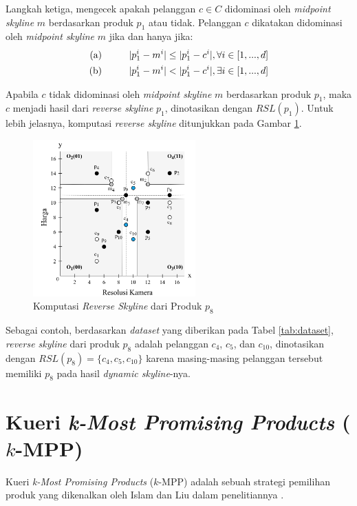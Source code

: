 Langkah ketiga, mengecek apakah pelanggan $c \in C$ didominasi oleh \textit{midpoint skyline} $m$ berdasarkan produk $p_1$ atau tidak. Pelanggan $c$ dikatakan didominasi oleh \textit{midpoint skyline} $m$ jika dan hanya jika:
\begin{equation}\label{eq:mid-skyline}
\begin{split}
\text{(a)} \hspace*{1cm} |p_1^i - m^i| \leq |p_1^i - c^i|, \forall i \in [1, ..., d] \\
\text{(b)} \hspace*{1cm} |p_1^i - m^i| < |p_1^i - c^i|, \exists i \in [1, ..., d]
\end{split}
\end{equation}

Apabila $c$ tidak didominasi oleh \textit{midpoint skyline} $m$ berdasarkan produk $p_1$, maka $c$ menjadi hasil dari \textit{reverse skyline} $p_1$, dinotasikan dengan $RSL(p_1)$. Untuk lebih jelasnya, komputasi \textit{reverse skyline} ditunjukkan pada Gambar \ref{fig:rsl}.

\begin{figure}[h]
	\centering
	\includegraphics[height=6cm]{bab2/img/rsl.png}
	\caption{Komputasi \textit{Reverse Skyline} dari Produk $p_8$}
	\label{fig:rsl}
\end{figure}

Sebagai contoh, berdasarkan \textit{dataset} yang diberikan pada Tabel \ref{tab:dataset}, \textit{reverse skyline} dari produk $p_8$ adalah pelanggan $c_4$, $c_5$, dan $c_{10}$, dinotasikan dengan $RSL(p_8) = \{c_4, c_5, c_{10}\}$ karena masing-masing pelanggan tersebut memiliki $p_8$ pada hasil \textit{dynamic skyline}-nya.

\section{Kueri \textit{k-Most Promising Products} ($k$-MPP)}
\tab Kueri \textit{k-Most Promising Products} ($k$-MPP) adalah sebuah strategi pemilihan produk yang dikenalkan oleh Islam dan Liu dalam penelitiannya \cite{kmpp}.

